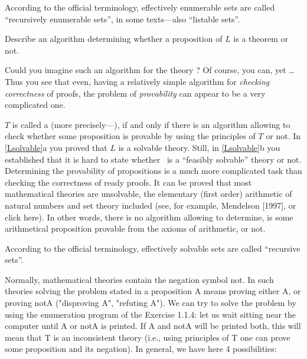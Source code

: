 \begin{note}
According to the official terminology, effectively enumerable sets are called ``recursively enumerable sets'', in some texts---also ``listable sets''.
\end{note}

\begin{exercise}\label{Lsolvable}
    \begin{inparaenum}[(a)]
        \item Describe an algorithm determining whether a proposition of \(L\) is a theorem or not.
        \item Could you imagine such an algorithm for the theory \CHESS?
        Of course, you can, yet \ldots
        Thus you see that even, having a relatively simple algorithm for \emph{checking correctness} of proofs, the problem of \emph{provability} can appear to be a very complicated one.
    \end{inparaenum}
\end{exercise}

\(T\) is called a  (more precisely---), if and only if there is an algorithm allowing to check whether some proposition is provable by using the principles of \(T\) or not.
In \cref{Lsolvable}a you proved that \(L\) is a solvable theory.
Still, in \cref{Lsolvable}b you established that it is hard to state whether \CHESS\ is a ``feasibly solvable'' theory or not.
Determining the provability of propositions is a much more complicated task than checking the correctness of ready proofs.
It can be proved that most mathematical theories are unsolvable, the elementary (first order) arithmetic of natural numbers and set theory included (see, for example, Mendelson [1997], or click here).
In other words, there is no algorithm allowing to determine, is some arithmetical proposition provable from the axioms of arithmetic, or not.

\begin{note}
According to the official terminology, effectively solvable sets are called ``recursive sets''.
\end{note}

Normally, mathematical theories contain the negation symbol not. In such theories solving the problem stated in a proposition A means proving either A, or proving notA ("disproving A", "refuting A"). We can try to solve the problem by using the enumeration program of the Exercise 1.1.4: let us wait sitting near the computer until A or notA is printed. If A and notA will be printed both, this will mean that T is an inconsistent theory (i.e., using principles of T one can prove some proposition and its negation). In general, we have here 4 possibilities:

